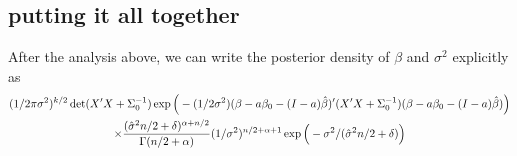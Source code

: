\subsection{putting it all together}

After the analysis above, we can write the posterior density of $\beta$
and $\sigma^2$ explicitly as
\begin{multline*}
  (1/2\pi\sigma^2)^{k/2} \det(X'X + \Sigma_0^{-1})
  \exp\Big(-(1/2\sigma^2) (\beta-a\beta_0-(I-a)\hat{\beta})'(X'X+\Sigma_0^{-1})(\beta-a\beta_0-(I-a)\hat{\beta})\Big) \\
  \times \frac{(\hat{\sigma}^2 n/2 + \delta)^{\alpha + n/2}}{\Gamma(n/2 + \alpha)}
    (1/\sigma^2)^{n/2+\alpha+1}\exp\Big(-\sigma^2/(\hat{\sigma}^2 n/2 + \delta)\Big)
\end{multline*}

